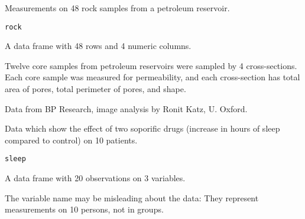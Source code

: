 %
\begin{Description}\relax
Measurements on 48 rock samples from a petroleum reservoir.
\end{Description}
%
\begin{Usage}
\begin{verbatim}
rock
\end{verbatim}
\end{Usage}
%
\begin{Format}
A data frame with 48 rows and 4 numeric columns.


\end{Format}
%
\begin{Details}\relax
Twelve core samples from petroleum reservoirs were sampled by 4
cross-sections.  Each core sample was measured for permeability, and
each cross-section has total area of pores, total perimeter of
pores, and shape.
\end{Details}
%
\begin{Source}\relax
Data from BP Research, image analysis by Ronit Katz, U. Oxford.
\end{Source}
%
\begin{Description}\relax
Data which show the effect of two soporific drugs (increase in hours
of sleep compared to control) on 10 patients.
\end{Description}
%
\begin{Usage}
\begin{verbatim}
sleep
\end{verbatim}
\end{Usage}
%
\begin{Format}
A data frame with 20 observations on 3 variables.

\end{Format}
%
\begin{Details}\relax
The  variable name may be misleading about the data:
They represent measurements on 10 persons, not in groups.

\end{Details}
